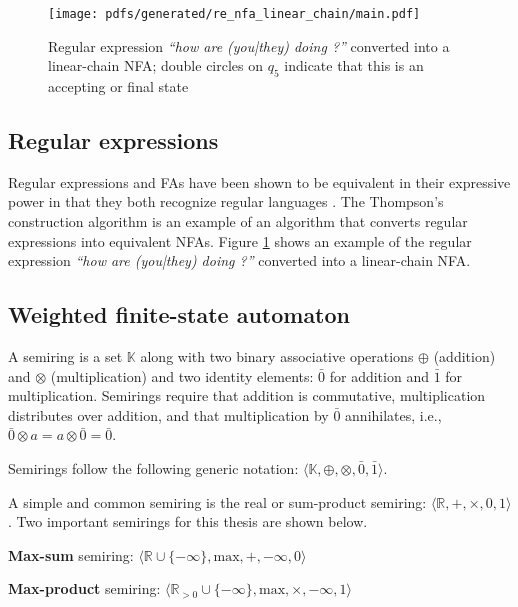 \begin{figure}[t]
  \centering
  \texttt{[image: pdfs/generated/re\_nfa\_linear\_chain/main.pdf]}
  \caption{Regular expression \textit{``how are (you|they) doing ?''} converted into a linear-chain NFA; double circles on $q_5$ indicate that this is an accepting or final state}
  \label{fig:regex-fsa}
\end{figure}

\subsection{Regular expressions}

Regular expressions and FAs have been shown to be equivalent in their expressive power in that they both recognize regular languages \citep{sipser1996introduction}. The Thompson's construction algorithm \citep{thompson1968programming} is an example of an algorithm that converts regular expressions into equivalent NFAs. Figure \ref{fig:regex-fsa} shows an example of the regular expression \textit{``how are (you|they) doing ?''} converted into a linear-chain NFA.

\subsection{Weighted finite-state automaton}

\begin{definition}
  A semiring is a set $\mathbb{K}$ along with two binary associative operations $\oplus$ (addition) and $\otimes$ (multiplication) and two identity elements: $\bar{0}$ for addition and $\bar{1}$ for multiplication. Semirings require that addition is commutative, multiplication distributes over addition, and that multiplication by $\bar{0}$ annihilates, i.e., $\bar{0} \otimes a = a \otimes \bar{0} = \bar{0}$.

\begin{remark}
  Semirings follow the following generic notation: $\langle \mathbb{K}, \oplus, \otimes, \bar{0}, \bar{1} \rangle$.
\end{remark}

\begin{remark}
  A simple and common semiring is the real or sum-product semiring: $\langle \mathbb{R}, +, \times, 0, 1 \rangle$. Two important semirings for this thesis are shown below.
\end{remark}

\begin{remark}
  \textbf{Max-sum} semiring: $\langle \mathbb{R} \cup \{-\infty\}, \text{max}, +, -\infty, 0 \rangle$
\end{remark}

\begin{remark}
  \textbf{Max-product} semiring: $\langle \mathbb{R}_{>0} \cup \{-\infty\}, \text{max}, \times, -\infty, 1 \rangle$
\end{remark}

\end{definition}

